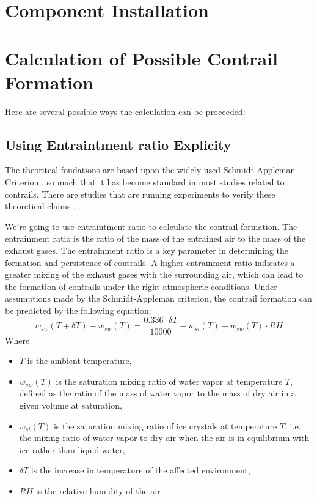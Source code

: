 \documentclass[a4paper, 12pt]{report}
\begin{document}
\chapter{Component Installation}

\chapter{Calculation of Possible Contrail Formation}
Here are several possible ways the calculation can be proceeded:
\section{Using Entraintment ratio Explicity}
The theoritcal foudations are based upon the widely used Schmidt-Appleman Criterion \cite{appleman1953formation}, so much that it has become standard in most studies related to contrails. There are studies that are running experiments to verify these theoretical claims \cite{ghedhaifi2019influence}.

We're going to use entraintment ratio to calculate the contrail formation. The entrainment ratio is the ratio of the mass of the entrained air to the mass of the exhaust gases. The entrainment ratio is a key parameter in determining the formation and persistence of contrails. A higher entrainment ratio indicates a greater mixing of the exhaust gases with the surrounding air, which can lead to the formation of contrails under the right atmospheric conditions.
Under assumptions made by the Schmidt-Appleman criterion, the contrail formation can be predicted by the following equation:
\begin{equation}\label{main_eq}
        w_{sw}(T+\delta T) - w_{sw}(T) = \frac{0.336\cdot \delta T}{10000} - w_{si}(T) + w_{sw}(T)\cdot RH
\end{equation}
Where 
\begin{itemize}[label={$\bigstar$ }]
        \item $T$ is the ambient temperature,
        \item $w_{sw}(T)$ is the saturation mixing ratio of water vapor at temperature $T$, defined as the ratio of the mass of water vapor to the mass of dry air in a given volume at saturation,
        \item $w_{si}(T)$ is the saturation mixing ratio of ice crystals at temperature $T$, i.e. the mixing ratio of water vapor to dry air when the air is in equilibrium with ice rather than liquid water, 
        \item $\delta T$ is the increase in temperature of the affected environment,
        \item $RH$ is the relative humidity of the air
\end{itemize}
\end{document}
